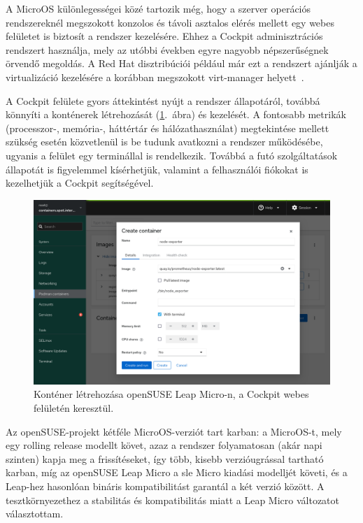 A MicroOS különlegességei közé tartozik még, hogy a szerver operációs rendszereknél megszokott konzolos és távoli asztalos elérés mellett egy webes felületet is biztosít a rendszer kezelésére. Ehhez a Cockpit adminisztrációs rendszert használja, mely az utóbbi években egyre nagyobb népszerűségnek örvendő megoldás. A Red Hat disztribúciói például már ezt a rendszert ajánlják a virtualizáció kezelésére a korábban megszokott virt-manager helyett~\cite{RHELDeprecated}.

A Cockpit felülete gyors áttekintést nyújt a rendszer állapotáról, továbbá könnyíti a konténerek létrehozását (\ref{fig:cockpit-container}.~ábra) és kezelését. A fontosabb metrikák (processzor-, memória-, háttértár és hálózathasználat) megtekintése mellett szükség esetén közvetlenül is be tudunk avatkozni a rendszer működésébe, ugyanis a felület egy terminállal is rendelkezik. Továbbá a futó szolgáltatások állapotát is figyelemmel kísérhetjük, valamint a felhasználói fiókokat is kezelhetjük a Cockpit segítségével.

\begin{figure}[ht]
	\centering
	\includegraphics[width=15cm]{figures/cockpit.png}
	\caption{Konténer létrehozása openSUSE Leap Micro-n, a Cockpit webes felületén keresztül.}
	\label{fig:cockpit-container}
\end{figure}

Az openSUSE-projekt kétféle MicroOS-verziót tart karban: a MicroOS-t, mely egy rolling release modellt követ, azaz a rendszer folyamatosan (akár napi szinten) kapja meg a frissítéseket, így több, kisebb verzióugrással tartható karban, míg az openSUSE Leap Micro a \acrlong{sle} Micro kiadási modelljét követi, és a Leap-hez hasonlóan bináris kompatibilitást garantál a két verzió között. A tesztkörnyezethez a stabilitás és kompatibilitás miatt a Leap Micro változatot választottam.

